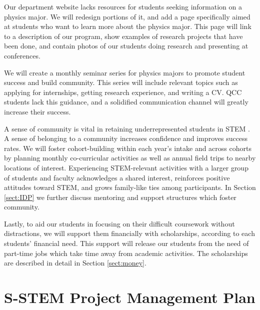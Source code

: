 \documentclass[12pt]{article}
\begin{document}
Our department website lacks resources for students seeking information on a physics major.  We will redesign portions of it, and add a page specifically aimed at students who want to learn more about the physics major.  This page will link to a description of our program, show examples of research projects that have been done, and contain photos of our students doing research and presenting at conferences.
	
We will create a monthly seminar series for physics majors to promote student success and build community.  This series will include relevant topics such as applying for internships, getting research experience, and writing a CV.  QCC students lack this guidance, and a solidified communication channel will greatly increase their success.

A sense of community is vital in retaining underrepresented students in STEM \citep[][and references therein]{NAP25257}.  A sense of belonging to a community increases confidence and improves success rates.  We will foster cohort-building within each year's intake and across cohorts by planning monthly co-curricular activities as well as annual field trips to nearby locations of interest.  Experiencing STEM-relevant activities with a larger group of students and faculty acknowledges a shared interest, reinforces positive attitudes toward STEM, and grows family-like ties among participants.  In Section \ref{sect:IDP} we further discuss mentoring and support structures which foster community.

Lastly, to aid our students in focusing on their difficult coursework without distractions, we will support them financially with scholarships, according to each students' financial need.  This support will release our students from the need of part-time jobs which take time away from academic activities.  The scholarships are described in detail in Section \ref{sect:money}.

\vspace{-5mm}


\section{\large{S-STEM Project Management Plan}\label{sect:money}}
\vspace{-3mm}
\end{document}
